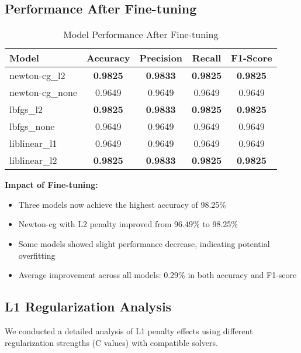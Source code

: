 \documentclass[12pt,a4paper]{article}
\begin{document}
\subsection{Performance After Fine-tuning}

\begin{table}[H]
\centering
\caption{Model Performance After Fine-tuning}
\begin{tabular}{|l|c|c|c|c|}
\hline
\textbf{Model} & \textbf{Accuracy} & \textbf{Precision} & \textbf{Recall} & \textbf{F1-Score} \\
\hline
newton-cg\_l2 & \textbf{0.9825} & \textbf{0.9833} & \textbf{0.9825} & \textbf{0.9825} \\
newton-cg\_none & 0.9649 & 0.9649 & 0.9649 & 0.9649 \\
lbfgs\_l2 & \textbf{0.9825} & \textbf{0.9833} & \textbf{0.9825} & \textbf{0.9825} \\
lbfgs\_none & 0.9649 & 0.9649 & 0.9649 & 0.9649 \\
liblinear\_l1 & 0.9649 & 0.9649 & 0.9649 & 0.9649 \\
liblinear\_l2 & \textbf{0.9825} & \textbf{0.9833} & \textbf{0.9825} & \textbf{0.9825} \\
\hline
\end{tabular}
\end{table}

\textbf{Impact of Fine-tuning:}
\begin{itemize}
    \item Three models now achieve the highest accuracy of 98.25\%
    \item Newton-cg with L2 penalty improved from 96.49\% to 98.25\%
    \item Some models showed slight performance decrease, indicating potential overfitting
    \item Average improvement across all models: 0.29\% in both accuracy and F1-score
\end{itemize}

\subsection{L1 Regularization Analysis}

We conducted a detailed analysis of L1 penalty effects using different regularization strengths (C values) with compatible solvers.
\end{document}
